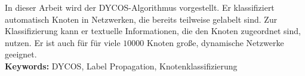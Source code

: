 In dieser Arbeit wird der DYCOS-Algorithmus vorgestellt. Er 
klassifiziert automatisch Knoten in Netzwerken, die bereits
teilweise gelabelt sind. Zur Klassifizierung kann er textuelle
Informationen, die den Knoten zugeordnet sind, nutzen. Er ist
auch für für viele $\num{10000}$ Knoten große, dynamische Netzwerke
geeignet.\\

\textbf{Keywords:} DYCOS, Label Propagation, Knotenklassifizierung
